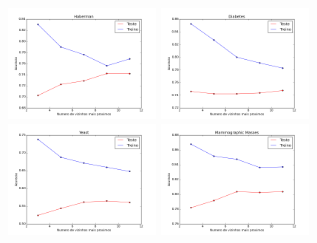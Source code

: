 \documentclass[12pt, a4paper, brazil]{article}
\begin{document}
\begin{landscape}
\begin{figure}[!htb]
    \includegraphics[width=0.35\textwidth]{Habermans_Survival/knn.png}    
    \includegraphics[width=0.35\textwidth]{Pima_Indians_Diabetes/knn.png}
    \includegraphics[width=0.35\textwidth]{Yeast/knn.png}
    \includegraphics[width=0.35\textwidth]{Mammographic_Mass/knn.png}
\end{figure}
\end{landscape}
\end{document}
